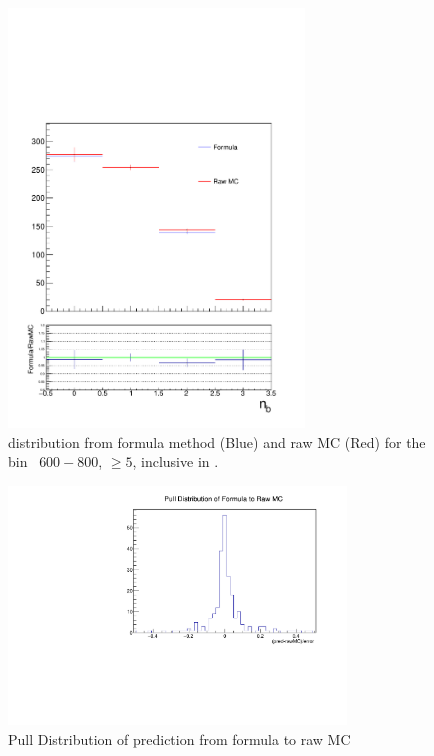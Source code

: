  \begin{figure}[h!]
  \centering
  \includegraphics[width=0.7\textwidth]{figures/btagformula/ge5j_600_0_Inc_GoodNb.pdf} 
  \caption{\label{fig:mhtShape_ge5j_ge3b_ht600} \nb distribution from formula
   method (Blue) and raw MC (Red) for the bin \scalht~$600-800$, \njet $\geq 5$, inclusive
   in \mht.}
\end{figure}

 \begin{figure}[h!]
  \centering
  \includegraphics[width=0.8\textwidth]{figures/btagformula/pull.pdf} 
  \caption{\label{fig:pull} Pull Distribution of prediction from formula to raw MC}
\end{figure}

